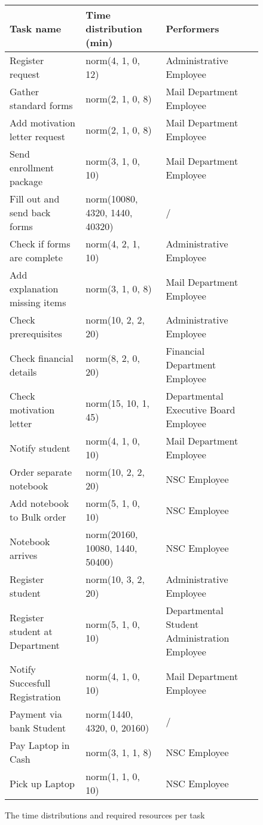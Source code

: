 \begin{figure}[h!]
	\centering
	\begin{tabularx}{\textwidth}{ | X | X | X | }
		\hline
		\textbf{Task name} & \textbf{Time distribution (min)} & \textbf{Performers}\\ \hline\hline
		Register request & norm(4, 1, 0, 12) & Administrative Employee \\ \hline
		Gather standard forms & norm(2, 1, 0, 8) & Mail Department Employee \\ \hline
		Add motivation letter request & norm(2, 1, 0, 8) & Mail Department Employee \\ \hline
		Send enrollment package & norm(3, 1, 0, 10) & Mail Department Employee \\ \hline
		Fill out and send back forms & norm(10080, 4320, 1440, 40320) & / \\ \hline
		Check if forms are complete & norm(4, 2, 1, 10) & Administrative Employee \\ \hline
		Add explanation missing items & norm(3, 1, 0, 8) & Mail Department Employee \\ \hline
		Check prerequisites & norm(10, 2, 2, 20) & Administrative Employee \\ \hline
		Check financial details & norm(8, 2, 0, 20) & Financial Department Employee \\ \hline
		Check motivation letter & norm(15, 10, 1, 45) & Departmental Executive Board Employee \\ \hline
		Notify student & norm(4, 1, 0, 10) & Mail Department Employee \\ \hline
		Order separate notebook & norm(10, 2, 2, 20) & NSC Employee \\ \hline
		Add notebook to Bulk order & norm(5, 1, 0, 10) & NSC Employee \\ \hline
		Notebook arrives & norm(20160, 10080, 1440, 50400) & NSC Employee \\ \hline
		Register student & norm(10, 3, 2, 20) & 
		Administrative Employee \\ \hline
		Register student at Department & norm(5, 1, 0, 10) & Departmental Student Administration Employee \\ \hline
		Notify Succesfull Registration & norm(4, 1, 0, 10) & Mail Department Employee \\ \hline
		Payment via bank Student & norm(1440, 4320, 0, 20160) & / \\ \hline
		Pay Laptop in Cash & norm(3, 1, 1, 8) & NSC Employee \\ \hline
		Pick up Laptop & norm(1, 1, 0, 10) & NSC Employee \\
		\hline
	\end{tabularx}
	\caption{The time distributions and required resources per task}
	\label{fig:tasktimes1}
\end{figure}
	
